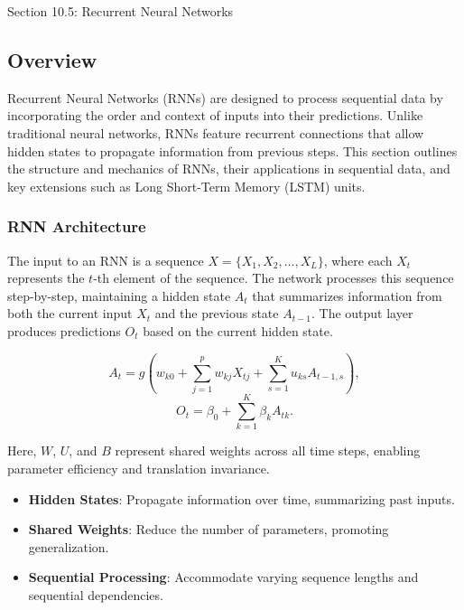 \begin{notes}{Section 10.5: Recurrent Neural Networks}
    \subsection*{Overview}

    Recurrent Neural Networks (RNNs) are designed to process sequential data by incorporating the order and context of inputs into their predictions. Unlike traditional neural networks, RNNs feature recurrent 
    connections that allow hidden states to propagate information from previous steps. This section outlines the structure and mechanics of RNNs, their applications in sequential data, and key extensions 
    such as Long Short-Term Memory (LSTM) units.
    
    \subsubsection*{RNN Architecture}
    
    The input to an RNN is a sequence $X = \{X_1, X_2, \ldots, X_L\}$, where each $X_t$ represents the $t$-th element of the sequence. The network processes this sequence step-by-step, maintaining 
    a hidden state $A_t$ that summarizes information from both the current input $X_t$ and the previous state $A_{t-1}$. The output layer produces predictions $O_t$ based on the current hidden state.
    
    \[
    A_t = g\left(w_{k0} + \sum_{j=1}^p w_{kj} X_{tj} + \sum_{s=1}^K u_{ks} A_{t-1,s}\right),
    \]
    \[
    O_t = \beta_0 + \sum_{k=1}^K \beta_k A_{tk}.
    \]
    
    Here, $W$, $U$, and $B$ represent shared weights across all time steps, enabling parameter efficiency and translation invariance.
    
    \begin{highlight}
        \begin{itemize}
            \item \textbf{Hidden States}: Propagate information over time, summarizing past inputs.
            \item \textbf{Shared Weights}: Reduce the number of parameters, promoting generalization.
            \item \textbf{Sequential Processing}: Accommodate varying sequence lengths and sequential dependencies.
        \end{itemize}
    \end{highlight}
    

\end{notes}
